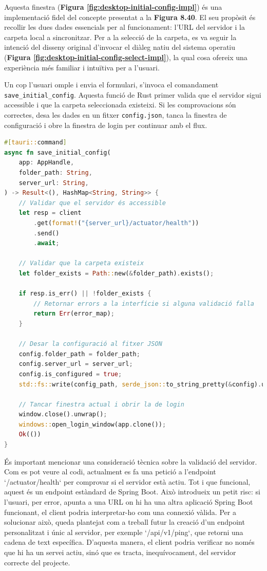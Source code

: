 Aquesta finestra (\textbf{Figura \ref{fig:desktop-initial-config-impl}}) és una implementació fidel del concepte presentat a la \textbf{Figura 8.40}. El seu propòsit és recollir les dues dades essencials per al funcionament: l'URL del servidor i la carpeta local a sincronitzar. Per a la selecció de la carpeta, es va seguir la intenció del disseny original d'invocar el diàleg natiu del sistema operatiu (\textbf{Figura \ref{fig:desktop-initial-config-select-impl}}), la qual cosa ofereix una experiència més familiar i intuïtiva per a l'usuari.

Un cop l'usuari omple i envia el formulari, s'invoca el comandament \texttt{save\_initial\_config}. Aquesta funció de Rust primer valida que el servidor sigui accessible i que la carpeta seleccionada existeixi. Si les comprovacions són correctes, desa les dades en un fitxer \texttt{config.json}, tanca la finestra de configuració i obre la finestra de login per continuar amb el flux.

\begin{lstlisting}[language=rust, caption={Comandament per desar la configuració inicial a \texttt{main.rs}}]
#[tauri::command]
async fn save_initial_config(
    app: AppHandle,
    folder_path: String,
    server_url: String,
) -> Result<(), HashMap<String, String>> {
    // Validar que el servidor és accessible
    let resp = client
        .get(format!("{server_url}/actuator/health"))
        .send()
        .await;
        
    // Validar que la carpeta existeix
    let folder_exists = Path::new(&folder_path).exists();
    
    if resp.is_err() || !folder_exists {
        // Retornar errors a la interfície si alguna validació falla
        return Err(error_map);
    }
    
    // Desar la configuració al fitxer JSON
    config.folder_path = folder_path;
    config.server_url = server_url;
    config.is_configured = true;
    std::fs::write(config_path, serde_json::to_string_pretty(&config).unwrap()).unwrap();
    
    // Tancar finestra actual i obrir la de login
    window.close().unwrap();
    windows::open_login_window(app.clone());
    Ok(())
}
\end{lstlisting}

És important mencionar una consideració tècnica sobre la validació del servidor. Com es pot veure al codi, actualment es fa una petició a l'endpoint `/actuator/health` per comprovar si el servidor està actiu. Tot i que funcional, aquest és un endpoint estàndard de Spring Boot. Això introdueix un petit risc: si l'usuari, per error, apunta a una URL on hi ha una altra aplicació Spring Boot funcionant, el client podria interpretar-ho com una connexió vàlida. Per a solucionar això, queda plantejat com a treball futur la creació d'un endpoint personalitzat i únic al servidor, per exemple `/api/v1/ping`, que retorni una cadena de text específica. D'aquesta manera, el client podria verificar no només que hi ha un servei actiu, sinó que es tracta, inequívocament, del servidor correcte del projecte.


